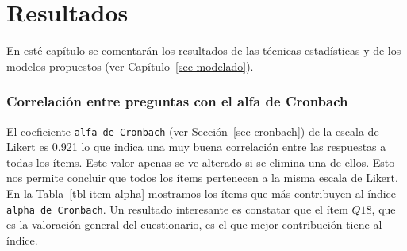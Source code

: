 \documentclass[
  12pt,
  a4paper,
  extrafontsizes,
  onecolumn,
  openright,
  table]{memoir}
\begin{document}
\hypertarget{section-8}{%
\chapter{}\label{section-8}}


\hypertarget{section-9}{%
\chapter{}\label{section-9}}


\hypertarget{section-10}{%
\chapter{}\label{section-10}}


\hypertarget{sec-resultados}{%
\chapter{Resultados}\label{sec-resultados}}

En esté capítulo se comentarán los resultados de las técnicas
estadísticas y de los modelos propuestos (ver
Capítulo~\ref{sec-modelado}).

\hypertarget{sec-cronbach-2}{%
\subsection{Correlación entre preguntas con el alfa de
Cronbach}\label{sec-cronbach-2}}

\scriptsize

\normalsize

El coeficiente \texttt{alfa\ de\ Cronbach} (ver
Sección~\ref{sec-cronbach}) de la escala de Likert es 0.921 lo que
indica una muy buena correlación entre las respuestas a todas los ítems.
Este valor apenas se ve alterado si se elimina una de ellos. Esto nos
permite concluir que todos los ítems pertenecen a la misma escala de
Likert. En la Tabla~\ref{tbl-item-alpha} mostramos los ítems que más
contribuyen al índice \texttt{alpha\ de\ Cronbach}. Un resultado
interesante es constatar que el ítem \(Q18\), que es la valoración
general del cuestionario, es el que mejor contribución tiene al índice.

\tiny
\end{document}
